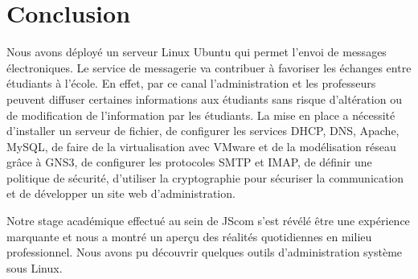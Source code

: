 \documentclass[a4paper,12pt,french]{report} %
\begin{document}

\chapter*{Conclusion}
Nous avons déployé un serveur Linux Ubuntu qui permet l'envoi de messages électroniques. Le service de messagerie va contribuer à favoriser les échanges entre étudiants à l'école. En effet, par ce canal l'administration et les professeurs peuvent diffuser certaines informations aux étudiants sans risque d'altération ou de modification de l'information par les étudiants. La mise en place a nécessité d'installer un serveur de fichier, de configurer les services DHCP, DNS, Apache, MySQL, de faire de la virtualisation avec VMware et de la modélisation réseau grâce à GNS3, de configurer les protocoles SMTP et IMAP, de définir une politique de sécurité, d'utiliser la cryptographie pour sécuriser la communication et de développer un site web d'administration.

Notre stage académique effectué au sein de JScom s'est révélé être une expérience marquante et nous a montré un aperçu des réalités quotidiennes en milieu professionnel. Nous avons pu découvrir quelques outils d'administration système sous Linux. 

\nocite{ref1}
\nocite{ref2}
\nocite{ref3}
\nocite{ref4}
\nocite{ref5}
\nocite{ref6}
\nocite{ref7}
\nocite{ref8}
\nocite{ref9}
\nocite{ref10}
\nocite{ref11}
\nocite{ref12}
\nocite{ref13}
\nocite{ref14}
\nocite{ref15}
\nocite{ref16}
\nocite{ref17}

\end{document}
